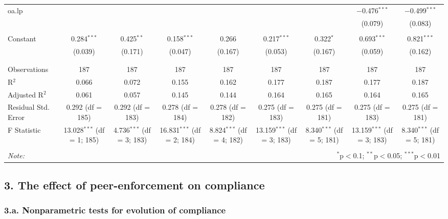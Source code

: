 \documentclass[
]{article}
\begin{document}
\begin{table}[!htbp]
\begin{tabular}{@{\extracolsep{5pt}}lcccccccc}
 oa.lp &  &  &  &  &  &  & $-$0.476$^{***}$ & $-$0.499$^{***}$ \\ 
  &  &  &  &  &  &  & (0.079) & (0.083) \\ 
  & & & & & & & & \\ 
 Constant & 0.284$^{***}$ & 0.425$^{**}$ & 0.158$^{***}$ & 0.266 & 0.217$^{***}$ & 0.322$^{*}$ & 0.693$^{***}$ & 0.821$^{***}$ \\ 
  & (0.039) & (0.171) & (0.047) & (0.167) & (0.053) & (0.167) & (0.059) & (0.162) \\ 
  & & & & & & & & \\ 
\hline \\[-1.8ex] 
Observations & 187 & 187 & 187 & 187 & 187 & 187 & 187 & 187 \\ 
R$^{2}$ & 0.066 & 0.072 & 0.155 & 0.162 & 0.177 & 0.187 & 0.177 & 0.187 \\ 
Adjusted R$^{2}$ & 0.061 & 0.057 & 0.145 & 0.144 & 0.164 & 0.165 & 0.164 & 0.165 \\ 
Residual Std. Error & 0.292 (df = 185) & 0.292 (df = 183) & 0.278 (df = 184) & 0.278 (df = 182) & 0.275 (df = 183) & 0.275 (df = 181) & 0.275 (df = 183) & 0.275 (df = 181) \\ 
F Statistic & 13.028$^{***}$ (df = 1; 185) & 4.736$^{***}$ (df = 3; 183) & 16.831$^{***}$ (df = 2; 184) & 8.824$^{***}$ (df = 4; 182) & 13.159$^{***}$ (df = 3; 183) & 8.340$^{***}$ (df = 5; 181) & 13.159$^{***}$ (df = 3; 183) & 8.340$^{***}$ (df = 5; 181) \\ 
\hline 
\hline \\[-1.8ex] 
\textit{Note:}  & \multicolumn{8}{r}{$^{*}$p$<$0.1; $^{**}$p$<$0.05; $^{***}$p$<$0.01} \\ 
\end{tabular} 
\end{table}

\hypertarget{the-effect-of-peer-enforcement-on-compliance}{%
\subsection{3. The effect of peer-enforcement on
compliance}\label{the-effect-of-peer-enforcement-on-compliance}}

\hypertarget{a.-nonparametric-tests-for-evolution-of-compliance}{%
\subsubsection{3.a. Nonparametric tests for evolution of
compliance}\label{a.-nonparametric-tests-for-evolution-of-compliance}}
\end{document}
